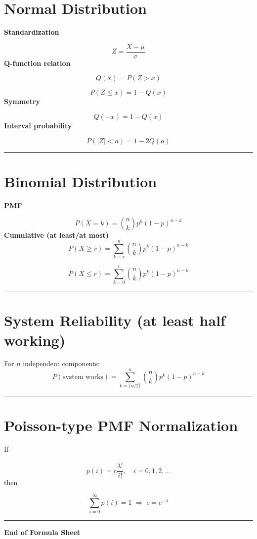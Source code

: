 \documentclass[12pt]{article}
\begin{document}
\section*{Normal Distribution}

\textbf{Standardization}

\[
Z = \frac{X - \mu}{\sigma}
\]
\textbf{Q-function relation}

\[
Q(x) = P(Z > x)
\]

\[
P(Z \le x) = 1 - Q(x)
\]
\textbf{Symmetry}

\[
Q(-x) = 1 - Q(x)
\]
\textbf{Interval probability}

\[
P(|Z| < a) = 1 - 2Q(a)
\]
\noindent\rule{\textwidth}{0.4pt}
\section*{Binomial Distribution}

\textbf{PMF}

\[
P(X = k) = \binom{n}{k} p^k (1-p)^{n-k}
\]
\textbf{Cumulative (at least/at most)}
\[
P(X \ge r) = \sum_{k=r}^{n} \binom{n}{k} p^k (1-p)^{n-k}
\]

\[
P(X \le r) = \sum_{k=0}^{r} \binom{n}{k} p^k (1-p)^{n-k}
\]
\noindent\rule{\textwidth}{0.4pt}
\section*{System Reliability (at least half working)}

For $n$ independent components:
\[
P(\text{system works}) =
\sum_{k=\lceil n/2 \rceil}^{n}
\binom{n}{k} p^k (1-p)^{n-k}
\]
\noindent\rule{\textwidth}{0.4pt}

\section*{Poisson-type PMF Normalization}

If

\[
p(i) = c \frac{\lambda^i}{i!}, \quad i = 0,1,2,\dots
\]
then

\[
\sum_{i=0}^{\infty} p(i) = 1 \;\Rightarrow\; c = e^{-\lambda}
\]
\noindent\rule{\textwidth}{0.4pt}
\begin{center}
\textbf{End of Formula Sheet}
\end{center}
\end{document}

